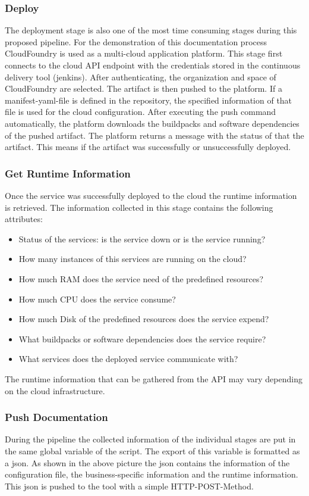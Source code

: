 \subsubsection{Deploy}
The deployment stage is also one of the most time consuming stages during this proposed pipeline. For the demonstration of this documentation process CloudFoundry is used as a multi-cloud application platform. This stage first connects to the cloud API endpoint with the credentials stored in the continuous delivery tool (jenkins). After authenticating, the organization and space of CloudFoundry are selected. The artifact is then pushed to the platform. If a manifest-yaml-file is defined in the repository, the specified information of that file is used for the cloud configuration. After executing the push command automatically, the platform downloads the buildpacks and software dependencies of the pushed artifact. The platform returns a message with the status of that the artifact. This means if the artifact was successfully or unsuccessfully deployed.

\subsubsection{Get Runtime Information}
Once the service was successfully deployed to the cloud the runtime information is retrieved. The information collected in this stage contains the following attributes:

\begin{itemize}
    \item Status of the services: is the service down or is the service running?
    \item How many instances of this services are running on the cloud?
    \item How much RAM does the service need of the predefined resources?
    \item How much CPU does the service consume?
    \item How much Disk of the predefined resources does the service expend?
    \item What buildpacks or software dependencies does the service require?
    \item What services does the deployed service communicate with?
\end{itemize}

The runtime information that can be gathered from the API may vary depending on the cloud infrastructure.

\subsubsection{Push Documentation}
During the pipeline the collected information of the individual stages are put in the same global variable of the script. The export of this variable is formatted as a json. As shown in the above picture the json contains the information of the configuration file, the business-specific information and the runtime information. This json is pushed to the tool with a simple HTTP-POST-Method.

